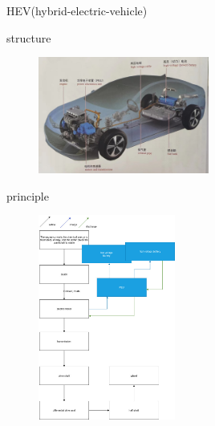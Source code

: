 \begin{frame}
	\begin{block}{HEV(hybrid-electric-vehicle)}
		\begin{compactitem}
			\item structure
			\begin{figure}[htbp]
				\centering
				\includegraphics[width=0.5\textwidth]{1-16}
			\end{figure}
		\end{compactitem}
	\end{block}
\end{frame}
\begin{frame}
	\begin{block}{}
		\begin{compactitem}
			\item principle
				\begin{figure}[htbp]
					\centering
					\includegraphics[width=0.4\textwidth]{1-17}
				\end{figure}
		\end{compactitem}
	\end{block}
\end{frame}
